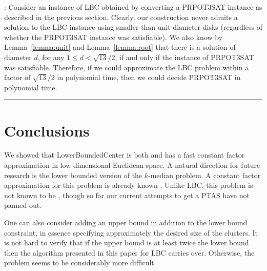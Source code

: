 \ifx\STACS\undefined \documentclass[12pt]{article}\else \documentclass[runningheads,a4paper]{llncs}
\newcommand{\InConfVer}[1]{}
\newcommand{\InFullVer}[1]{#1}
\newcommand{\InConfVer}[1]{#1}
\newcommand{\InFullVer}[1]{}
\newcommand{\PRPOTSAT}{\Term{PRPOT3SAT}\xspace}
\newcommand{\LowerBoundedCenter}   {\PStyle{{Lower{}Bounded{}Center}}\xspace}
\newcommand{\lbc}{\PStyle{LBC}\xspace}
\newcommand{\PTAS}{\Term{P{T}AS}\xspace}
\newcommand{\PStyle}[1]{\textcolor{red25}{\textrm{\textsf{#1}}}}
\newcommand{\Term}[1]{\textsf{#1}}
\newcommand{\lemref}[1]{Lemma~\ref{lemma:#1}}
\newcommand{\myqedsymbol}{\rule{2mm}{2mm}}
\newenvironment{proofext}{\noindent{\em Proof of
   }}{\hfill{\hfill\myqedsymbol}}
\begin{document}
\medskip

\begin{proofext}{\emph{\thmref{hardness}}}: Consider an instance of \lbc obtained by converting a
    \PRPOTSAT instance as described in the previous section.  
Clearly, our construction never admits a solution to the \lbc
    instance using smaller than unit diameter disks (regardless of
    whether the \PRPOTSAT instance was satisfiable).  We also know 
    by \lemref{unit} and \lemref{root}
    that there is a solution of diameter $d$, for any $1\leq d<
    \sqrt{13}/2$, if and only if the instance of \PRPOTSAT was
    satisfiable.  Therefore, if we could approximate the \lbc problem
    within a factor of $\sqrt{13}/2$ in polynomial time, then we could
    decide \PRPOTSAT in polynomial time.
\end{proofext}



\section{Conclusions}
We showed that \LowerBoundedCenter is both \APXHard and has a fast
constant factor approximation in low dimensional Euclidean space.  A
natural direction for future research is the lower bounded
version of the $k$-median problem.  A constant factor approximation
for this problem is already known \cite{as-iaglbfl-11,s-lbfl-10}.
Unlike \lbc, this problem is not known to be \APXHard,
though so far our current attempts to get a \PTAS have not panned out.

One can also consider adding an upper bound in addition to the lower bound
constraint, in essence specifying approximately the desired size of
the clusters.  It is not hard to verify that if the upper bound is at
least twice the lower bound then the algorithm presented in this paper
for \lbc carries over.  Otherwise, the problem seems to be
considerably more difficult.


\InConfVer{
}
\InFullVer{}








\newpage
\appendix
\end{document}
